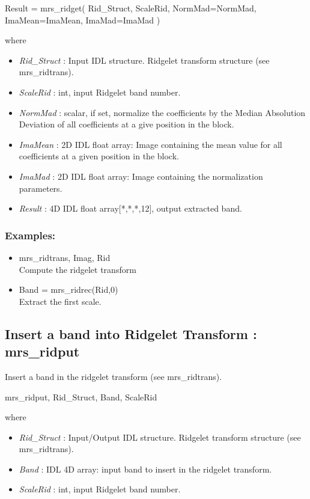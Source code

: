 {\bf
\begin{center}
     Result = mrs\_ridget( Rid\_Struct, ScaleRid, NormMad=NormMad, ImaMean=ImaMean, ImaMad=ImaMad ) 
\end{center}}
where
\begin{itemize}
\item {\em Rid\_Struct} : Input IDL structure. Ridgelet transform structure (see mrs\_ridtrans).
\item {\em ScaleRid} : int, input Ridgelet band number.
\item {\em NormMad} : scalar, if set, normalize the coefficients by the Median Absolution Deviation of all coefficients at a give position in the block.
\item {\em ImaMean} : 2D IDL float array: Image containing the mean value for all coefficients at a given position in the block.
\item {\em ImaMad} : 2D IDL float array: Image containing  the normalization parameters.
\item {\em Result} : 4D IDL float array[*,*,*,12], output extracted band.
\end{itemize}

\subsubsection*{Examples:} 
\begin{itemize}
\item mrs\_ridtrans, Imag, Rid   \\
Compute the ridgelet transform
\item Band = mrs\_ridrec(Rid,0) \\
Extract the first scale.
\end{itemize}



\subsection{Insert a band into Ridgelet Transform : mrs\_ridput}
Insert a band in the ridgelet transform (see mrs\_ridtrans).   
{\bf
\begin{center}
      mrs\_ridput, Rid\_Struct, Band, ScaleRid
\end{center}}
where
\begin{itemize}
\item {\em Rid\_Struct} : Input/Output IDL structure. Ridgelet transform structure (see mrs\_ridtrans).
\item {\em Band} : IDL 4D array: input band to insert in the ridgelet transform.
\item {\em ScaleRid} : int, input Ridgelet band number.
\end{itemize}

